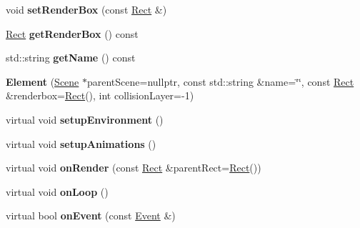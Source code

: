 \begin{DoxyCompactItemize}
\mbox{\label{classbkengine_1_1Element_ae1dc97b40cd57da416e872dda8dab6f0}} 
void {\bfseries set\+Render\+Box} (const \hyperlink{structbkengine_1_1Rect}{Rect} \&)
\item 
\mbox{\label{classbkengine_1_1Element_ae77ef65af18663617de94580af9105ca}} 
\hyperlink{structbkengine_1_1Rect}{Rect} {\bfseries get\+Render\+Box} () const
\item 
\mbox{\label{classbkengine_1_1Element_a7ecc72f1f593b2b60e24f0aab04fcb30}} 
std\+::string {\bfseries get\+Name} () const
\item 
\mbox{\label{classbkengine_1_1Element_a7cc283a0caeba6d97159b1073f9b5051}} 
{\bfseries Element} (\hyperlink{classbkengine_1_1Scene}{Scene} $\ast$parent\+Scene=nullptr, const std\+::string \&name=\char`\"{}\char`\"{}, const \hyperlink{structbkengine_1_1Rect}{Rect} \&renderbox=\hyperlink{structbkengine_1_1Rect}{Rect}(), int collision\+Layer=-\/1)
\item 
\mbox{\label{classbkengine_1_1Element_a11f523eef968855c8780e47e1dc7b977}} 
virtual void {\bfseries setup\+Environment} ()
\item 
\mbox{\label{classbkengine_1_1Element_aafdd4a5e2af3f78c41cb5c429c72433f}} 
virtual void {\bfseries setup\+Animations} ()
\item 
\mbox{\label{classbkengine_1_1Element_a9cd4b952fd8b635787896d7d62c303e3}} 
virtual void {\bfseries on\+Render} (const \hyperlink{structbkengine_1_1Rect}{Rect} \&parent\+Rect=\hyperlink{structbkengine_1_1Rect}{Rect}())
\item 
\mbox{\label{classbkengine_1_1Element_ac366eebb8a84c35989fd347c988c0737}} 
virtual void {\bfseries on\+Loop} ()
\item 
\mbox{\label{classbkengine_1_1Element_ab1ad430710a064b28a70b42e4b59a470}} 
virtual bool {\bfseries on\+Event} (const \hyperlink{classbkengine_1_1Event}{Event} \&)
\item 
\mbox{\label{classbkengine_1_1Element_a7ce83303f60b5f5b3d85e70ca58923fc}} 

\end{DoxyCompactItemize}
